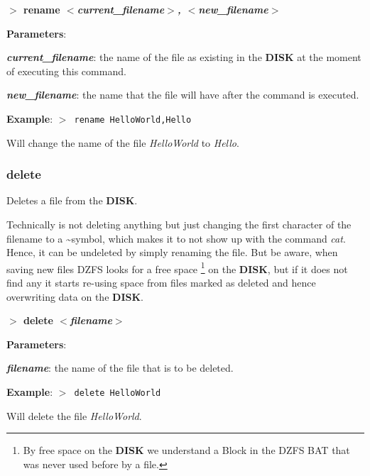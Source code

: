 \documentclass[a4paper,11pt]{article}
\begin{document}
        \hspace{1.9cm}\textbf{$>$ rename \textit{$<$current\_filename$>$,
        $<$new\_filename$>$}}

        \textbf{Parameters}:

        \hspace{1cm}\textbf{\textit{current\_filename}}: the name of the file as
        existing in the \textbf{DISK} at the moment of executing this command.
        
        \hspace{1cm}\textbf{\textit{new\_filename}}: the name that the file will
        have after the command is executed.

        \textbf{Example}: \texttt{$>$ rename HelloWorld,Hello}

        Will change the name of the file \textit{HelloWorld} to \textit{Hello}.

        \subsubsection{{\color{blue}delete}}
        Deletes a file from the \textbf{DISK}.

        Technically is not deleting anything but just changing the first
        character of the filename to a \textasciitilde symbol, which makes it to
        not show up with the command \textit{cat}. Hence, it can be undeleted by
        simply renaming the file. But be aware, when saving new files DZFS looks
        for a free space \footnote{By free space on the \textbf{DISK} we
        understand a Block in the DZFS BAT that was never used before by a
        file.} on the \textbf{DISK}, but if it does not find any it starts
        re-using space from files marked as deleted and hence overwriting data
        on the \textbf{DISK}.

        \hspace{1.9cm}\textbf{$>$ delete \textit{$<$filename$>$}}

        \textbf{Parameters}:

        \hspace{1cm}\textbf{\textit{filename}}: the name of the file that is to
        be deleted.
        
        \textbf{Example}: \texttt{$>$ delete HelloWorld}

        Will delete the file \textit{HelloWorld}.
\end{document}

